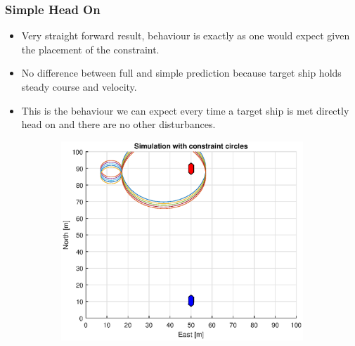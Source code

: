 \subsubsection{Simple Head On}
\begin{itemize}
    \item Very straight forward result, behaviour is exactly as one would expect given the placement of the constraint.
    \item No difference between full and simple prediction because target ship holds steady course and velocity.
    \item This is the behaviour we can expect every time a target ship is met directly head on and there are no other disturbances.
\end{itemize}
\clearpage
\begin{figure}[!b] %
    \begin{subfigure}[b]{0.49\textwidth}
        \centering
        \includegraphics[width=\textwidth]{Images/Figures/Enkel_HO/Simple0_f1_Frame1}
    \end{subfigure}
    \hfill
    \begin{subfigure}[b]{0.499\textwidth}
        \centering

\end{subfigure}
\end{figure}
